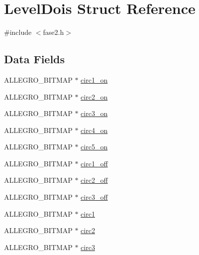 \hypertarget{struct_level_dois}{\section{Level\-Dois Struct Reference}
\label{struct_level_dois}
}


{\ttfamily \#include $<$fase2.\-h$>$}

\subsection*{Data Fields}
\begin{DoxyCompactItemize}
\item 
A\-L\-L\-E\-G\-R\-O\-\_\-\-B\-I\-T\-M\-A\-P $\ast$ \hyperlink{struct_level_dois_a15699608afb18fad793848cd8fd32fe0}{circ1\-\_\-on}
\item 
A\-L\-L\-E\-G\-R\-O\-\_\-\-B\-I\-T\-M\-A\-P $\ast$ \hyperlink{struct_level_dois_aa582b8f9acdbb85a2d1d54705e26fa15}{circ2\-\_\-on}
\item 
A\-L\-L\-E\-G\-R\-O\-\_\-\-B\-I\-T\-M\-A\-P $\ast$ \hyperlink{struct_level_dois_ad58139cfabe6836662aec8a3293c9208}{circ3\-\_\-on}
\item 
A\-L\-L\-E\-G\-R\-O\-\_\-\-B\-I\-T\-M\-A\-P $\ast$ \hyperlink{struct_level_dois_ae514d3cf3c3cb83de5ab4682ead1c7f6}{circ4\-\_\-on}
\item 
A\-L\-L\-E\-G\-R\-O\-\_\-\-B\-I\-T\-M\-A\-P $\ast$ \hyperlink{struct_level_dois_a1537bde5184cc347504f101c712fb0ee}{circ5\-\_\-on}
\item 
A\-L\-L\-E\-G\-R\-O\-\_\-\-B\-I\-T\-M\-A\-P $\ast$ \hyperlink{struct_level_dois_a61973bafd11ab9dea9306731297f4728}{circ1\-\_\-off}
\item 
A\-L\-L\-E\-G\-R\-O\-\_\-\-B\-I\-T\-M\-A\-P $\ast$ \hyperlink{struct_level_dois_a384448f3d672f70b70b1bf454cb46e50}{circ2\-\_\-off}
\item 
A\-L\-L\-E\-G\-R\-O\-\_\-\-B\-I\-T\-M\-A\-P $\ast$ \hyperlink{struct_level_dois_a91273d7098df87dd93c9f9a10b62ed08}{circ3\-\_\-off}
\item 
A\-L\-L\-E\-G\-R\-O\-\_\-\-B\-I\-T\-M\-A\-P $\ast$ \hyperlink{struct_level_dois_a9877f31790b6d2f38fb468a9448223f1}{circ1}
\item 
A\-L\-L\-E\-G\-R\-O\-\_\-\-B\-I\-T\-M\-A\-P $\ast$ \hyperlink{struct_level_dois_a1b8836cb8a00a286c87bfbafdacbd03d}{circ2}
\item 
A\-L\-L\-E\-G\-R\-O\-\_\-\-B\-I\-T\-M\-A\-P $\ast$ \hyperlink{struct_level_dois_aaa21201ceebf455212233414bd6eedbc}{circ3}
\item 

\end{DoxyCompactItemize}
